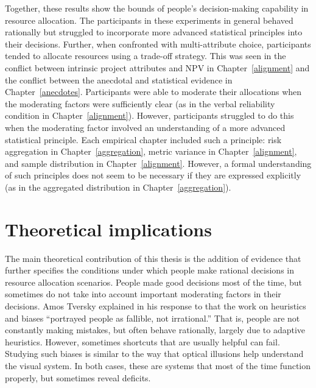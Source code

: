 \documentclass[a4paper, nobind, dvipsnames]{templates/ociamthesis}
\theoremstyle{definition}
\theoremstyle{definition}
\theoremstyle{definition}
\theoremstyle{definition}
\theoremstyle{remark}
\begin{document}
Together, these results show the bounds of people's decision-making capability
in resource allocation. The participants in these experiments in general behaved
rationally but struggled to incorporate more advanced statistical principles
into their decisions. Further, when confronted with multi-attribute choice,
participants tended to allocate resources using a trade-off strategy. This was
seen in the conflict between intrinsic project attributes and NPV in
Chapter~\ref{alignment} and the conflict between the anecdotal and statistical
evidence in Chapter~\ref{anecdotes}. Participants were able to moderate their
allocations when the moderating factors were sufficiently clear (as in the
verbal reliability condition in Chapter~\ref{alignment}). However, participants
struggled to do this when the moderating factor involved an understanding of a
more advanced statistical principle. Each empirical chapter included such a
principle: risk aggregation in Chapter~\ref{aggregation}, metric variance in
Chapter~\ref{alignment}, and sample distribution in Chapter~\ref{alignment}.
However, a formal understanding of such principles does not seem to be necessary
if they are expressed explicitly (as in the aggregated distribution in
Chapter~\ref{aggregation}).

\hypertarget{theoretical-implications-2}{%
\section{Theoretical implications}\label{theoretical-implications-2}}

The main theoretical contribution of this thesis is the addition of evidence
that further specifies the conditions under which people make rational decisions
in resource allocation scenarios. People made good decisions most of the time,
but sometimes do not take into account important moderating factors in their
decisions. Amos Tversky explained in his response to \textcite[p.~355]{cohen1981} that
the work on heuristics and biases ``portrayed people as fallible, not
irrational.'' That is, people are not constantly making mistakes, but often
behave rationally, largely due to adaptive heuristics. However, sometimes
shortcuts that are usually helpful can fail. Studying such biases is similar to
the way that optical illusions help understand the visual system. In both cases,
these are systems that most of the time function properly, but sometimes reveal
deficits.
\end{document}
